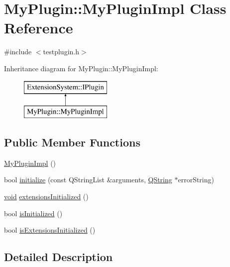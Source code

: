 \hypertarget{class_my_plugin_1_1_my_plugin_impl}{\section{\-My\-Plugin\-:\-:\-My\-Plugin\-Impl \-Class \-Reference}
\label{class_my_plugin_1_1_my_plugin_impl}
}


{\ttfamily \#include $<$testplugin.\-h$>$}

\-Inheritance diagram for \-My\-Plugin\-:\-:\-My\-Plugin\-Impl\-:\begin{figure}[H]
\begin{center}
\leavevmode
\includegraphics[height=2.000000cm]{class_my_plugin_1_1_my_plugin_impl}
\end{center}
\end{figure}
\subsection*{\-Public \-Member \-Functions}
\begin{DoxyCompactItemize}
\item 
\hyperlink{class_my_plugin_1_1_my_plugin_impl_a9c5dc5a0442c15477dafda27aaaa4dca}{\-My\-Plugin\-Impl} ()
\item 
bool \hyperlink{class_my_plugin_1_1_my_plugin_impl_a917bc0c4caf9ab591971b7b7d45fbaa8}{initialize} (const \-Q\-String\-List \&arguments, \hyperlink{group___u_a_v_objects_plugin_gab9d252f49c333c94a72f97ce3105a32d}{\-Q\-String} $\ast$error\-String)
\item 
\hyperlink{group___u_a_v_objects_plugin_ga444cf2ff3f0ecbe028adce838d373f5c}{void} \hyperlink{class_my_plugin_1_1_my_plugin_impl_a4ad1abbd9f078e73814e7e49232a9b6b}{extensions\-Initialized} ()
\item 
bool \hyperlink{class_my_plugin_1_1_my_plugin_impl_a3bd4c7c640ec6db82acc7ca660288a7a}{is\-Initialized} ()
\item 
bool \hyperlink{class_my_plugin_1_1_my_plugin_impl_a0128f76dfe36041c70eecd9ecb7a5aa8}{is\-Extensions\-Initialized} ()
\end{DoxyCompactItemize}


\subsection{\-Detailed \-Description}


